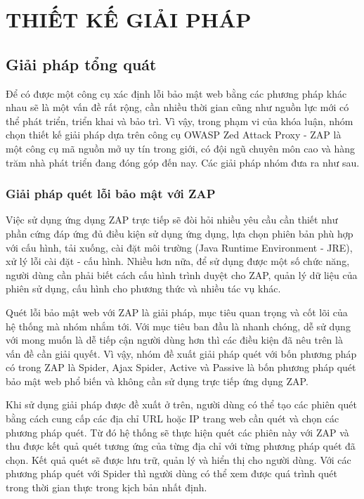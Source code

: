 \chapter{THIẾT KẾ GIẢI PHÁP}

\section{Giải pháp tổng quát} \label{sec:AbstractSol}

\tab Để có được một công cụ xác định lỗi bảo mật web bằng các phương pháp khác nhau sẽ là một vấn đề rất rộng, cần nhiều thời gian cũng như nguồn lực mới có thể phát triển, triển khai và bảo trì.
Vì vậy, trong phạm vi của khóa luận, nhóm chọn thiết kế giải pháp dựa trên công cụ OWASP Zed Attack Proxy - ZAP là một công cụ mã nguồn mở uy tín trong giới, có đội ngũ chuyên môn cao và hàng trăm nhà phát triển đang đóng góp đến nay.
Các giải pháp nhóm đưa ra như sau.

\subsection{Giải pháp quét lỗi bảo mật với ZAP}

\tab Việc sử dụng ứng dụng ZAP trực tiếp sẽ đòi hỏi nhiều yêu cầu cần thiết như phần cứng đáp ứng đủ điều kiện sử dụng ứng dụng, lựa chọn phiên bản phù hợp với cấu hình, tải xuống, cài đặt môi trường (Java Runtime Environment - JRE), xử lý lỗi cài đặt - cấu hình.
Nhiều hơn nữa, để sử dụng được một số chức năng, người dùng cần phải biết cách cấu hình trình duyệt cho ZAP, quản lý dữ liệu của phiên sử dụng, cấu hình cho phương thức và nhiều tác vụ khác.
\par

Quét lỗi bảo mật web với ZAP là giải pháp, mục tiêu quan trọng và cốt lõi của hệ thống mà nhóm nhắm tới.
Với mục tiêu ban đầu là nhanh chóng, dễ sử dụng với mong muốn là dễ tiếp cận người dùng hơn thì các điều kiện đã nêu trên là vấn đề cần giải quyết.
Vì vậy, nhóm đề xuất giải pháp quét với bốn phương pháp có trong ZAP là Spider, Ajax Spider, Active và Passive là bốn phương pháp quét bảo mật web phổ biến và không cần sử dụng trực tiếp ứng dụng ZAP.
\par

Khi sử dụng giải pháp được đề xuất ở trên, người dùng có thể tạo các phiên quét bằng cách cung cấp các địa chỉ URL hoặc IP trang web cần quét và chọn các phương pháp quét.
Từ đó hệ thống sẽ thực hiện quét các phiên này với ZAP và thu được kết quả quét tương ứng của từng địa chỉ với từng phương pháp quét đã chọn.
Kết quả quét sẽ được lưu trữ, quản lý và hiển thị cho người dùng.
Với các phương pháp quét với Spider thì người dùng có thể xem được quá trình quét trong thời gian thực trong kịch bản nhất định.

